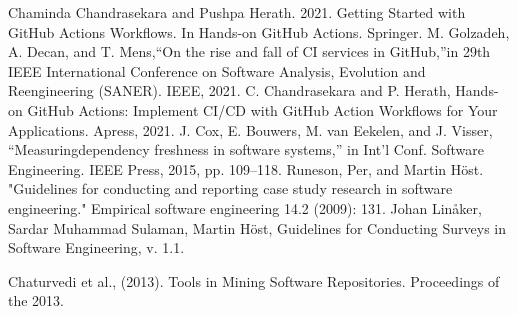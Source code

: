 \documentclass[conference]{IEEEtran}
\begin{document}
\begin{thebibliography}{00}
 Chaminda Chandrasekara and Pushpa Herath. 2021. Getting Started with GitHub Actions Workflows. In Hands-on GitHub Actions. Springer.
 M. Golzadeh, A. Decan, and T. Mens,“On the rise and fall of CI services in GitHub,”in 29th IEEE International Conference on Software Analysis, Evolution and Reengineering (SANER). IEEE, 2021.
 C. Chandrasekara and P. Herath, Hands-on GitHub Actions: Implement CI/CD with GitHub Action Workflows for Your Applications. Apress, 2021.
 J. Cox, E. Bouwers, M. van Eekelen, and J. Visser, “Measuringdependency freshness in software systems,” in Int’l Conf. Software Engineering. IEEE Press, 2015, pp. 109–118.
 Runeson, Per, and Martin Höst. "Guidelines for conducting and reporting case study research in software engineering." Empirical software engineering 14.2 (2009): 131.
 Johan Linåker, Sardar Muhammad Sulaman, Martin Höst, Guidelines for Conducting Surveys in Software Engineering, v. 1.1.

 Chaturvedi et al., (2013). Tools in Mining Software Repositories. Proceedings of the 2013. 


\end{thebibliography}
\vspace{12pt}
\end{document}
